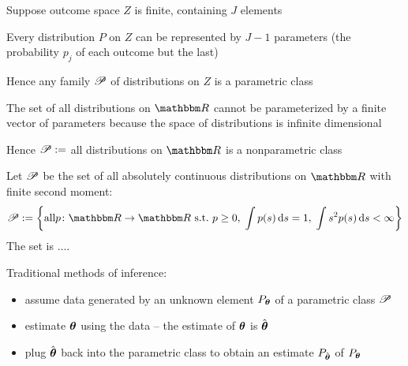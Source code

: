 \begin{frame}

    \vspace{2em}
    \Eg
    Suppose outcome space $Z$ is finite, containing $J$ elements
    
    Every distribution $P$ on $Z$ can be represented by $J-1$ parameters (the
    probability $p_j$ of each outcome but the last) 
    
    Hence any family $\mathscr P$
    of distributions on $Z$ is a parametric class
  
    \vspace{.7em}
    \Eg
    The set of all distributions on $\RR$ cannot be parameterized by a
    finite vector of parameters because the space of distributions is infinite
    dimensional
    
    Hence $\mathscr P :=$ all distributions on $\RR$ is a
    nonparametric class
    
\end{frame}

\begin{frame}
    
    \vspace{2em}
    \Eg
    Let $\mathscr P$ be the set of all absolutely continuous distributions on $\RR$
    with finite second moment:
    \small \begin{equation*}
        \pP := \left\{\text{all} p \colon \RR \to \RR \st
        p \geq 0, \; \int p(s)\diff s = 1, \; \int s^2 p(s) \diff s < \infty \right\}
    \end{equation*}
    The set is ....
    
\end{frame}

\begin{frame}
    
    \vspace{2em}
    Traditional methods of inference:
    
    \begin{itemize}
        \item  assume data generated by an unknown element $P_{{\boldsymbol \theta}}$ of a
        parametric class $\mathscr P$
        \item estimate ${\boldsymbol \theta}$ using the data  -- the estimate of ${\boldsymbol \theta}$ is $\hat {\boldsymbol \theta}$ 
        \item plug $\hat {\boldsymbol \theta}$ back into
        the parametric class to obtain an estimate $P_{\hat {\boldsymbol \theta}}$ of $P_{{\boldsymbol \theta}}$
    \end{itemize}
    
\end{frame}

